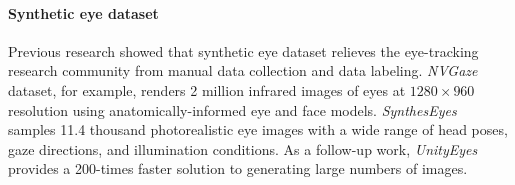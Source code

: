 \paragraph{Synthetic eye dataset}

Previous research showed that synthetic eye dataset relieves the eye-tracking
research community from manual data collection and data labeling.
\emph{NVGaze}~\cite{kim2019nvgaze} dataset, for example, renders 2 million
infrared images of eyes at \(1280 \times 960\) resolution using
anatomically-informed eye and face models.
\emph{SynthesEyes}~\cite{wood2015rendering} samples 11.4 thousand photorealistic
eye images with a wide range of head poses, gaze directions, and illumination
conditions. As a follow-up work, \emph{UnityEyes}~\cite{wood2016learning}
provides a 200-times faster solution to generating large numbers of images.
